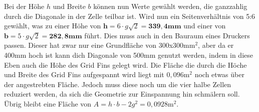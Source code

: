 Bei der Höhe $h$ und Breite $b$ können nun Werte gewählt werden, die ganzzahlig durch die Diagonale in der Zelle teilbar ist. Wird nun ein Seitenverhältnis von 5:6 gewählt, was zu einer Höhe von $\mathbf{h= }6\cdot g\sqrt{2}=\mathbf{339,4mm}$ und einer von $\mathbf{b= }5\cdot g\sqrt{2}=\mathbf{282,8mm}$ führt. Dies muss auch in den Bauraum eines Druckers passen. Dieser hat zwar nur eine Grundfläche von 300x300mm$^2$, aber da er 400mm hoch ist kann dich Diagonale von 500mm genutzt werden, indem in diese Eben auch die Höhe des Grid Fins gelegt wird. Die Fläche die durch die Höche und Breite des Grid Fins aufgespannt wird liegt mit $0,096\mathrm{m}^2$ noch etwas über der angestrebten Fläche. Jedoch muss diese noch um die vier halbe Zellen reduziert werden, da sich die Geometrie zur Einspannung hin schmälern soll. Übrig bleibt eine Fläche von $A=h\cdot b-2g^2=0,0928\mathrm{m}^2$.

